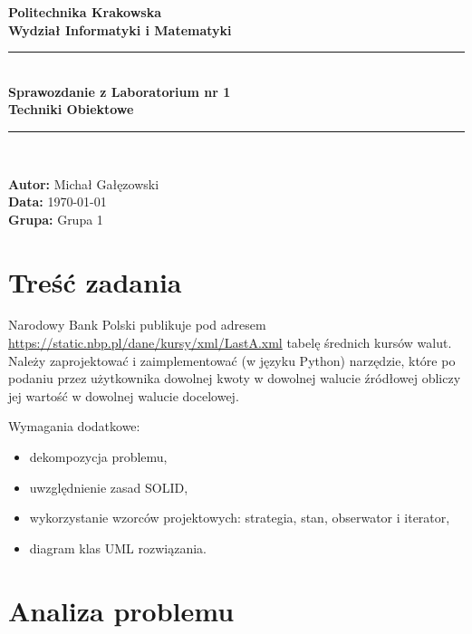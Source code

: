 \documentclass[12pt,a4paper]{article}
\begin{document}
\begin{center}
    \textbf{\Large Politechnika Krakowska} \\
    \textbf{\large Wydział Informatyki i Matematyki} \\
    \vspace{0.8cm}
    \strut \hrule \strut \\
    \vspace{0.4cm}
    {\huge \textbf{Sprawozdanie z Laboratorium nr 1}} \\
    \vspace{0.2cm}
    {\Large \textbf{Techniki Obiektowe}} \\
    \vspace{0.4cm}
    \strut \hrule \strut \\
\end{center}

\vspace{0.5cm}

\begin{flushright}
    \textbf{Autor:} Michał Gałęzowski \\
    \textbf{Data:} \today \\
    \textbf{Grupa:} Grupa 1
\end{flushright}

\section{Treść zadania}

Narodowy Bank Polski publikuje pod adresem \url{https://static.nbp.pl/dane/kursy/xml/LastA.xml} tabelę średnich kursów walut. Należy zaprojektować i zaimplementować (w języku Python) narzędzie, które po podaniu przez użytkownika dowolnej kwoty w dowolnej walucie źródłowej obliczy jej wartość w dowolnej walucie docelowej.

Wymagania dodatkowe:
\begin{itemize}
    \item dekompozycja problemu,
    \item uwzględnienie zasad SOLID,
    \item wykorzystanie wzorców projektowych: strategia, stan, obserwator i iterator,
    \item diagram klas UML rozwiązania.
\end{itemize}

\section{Analiza problemu}
\end{document}
